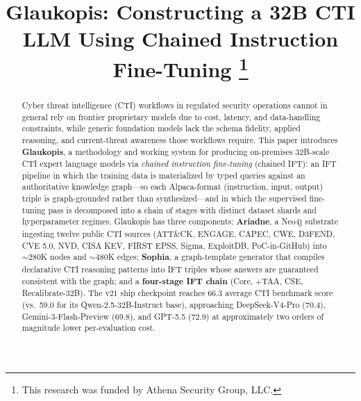 \documentclass[conference]{IEEEtran}
\begin{document}
\title{Glaukopis: Constructing a 32B CTI LLM Using Chained Instruction Fine-Tuning
\thanks{This research was funded by Athena Security Group, LLC.}
}

\author{%
%
}

\maketitle

\begin{abstract}
Cyber threat intelligence (CTI) workflows in regulated security operations cannot in general rely on frontier proprietary models due to cost, latency, and data-handling constraints, while generic foundation models lack the schema fidelity, applied reasoning, and current-threat awareness those workflows require. This paper introduces \textbf{Glaukopis}, a methodology and working system for producing on-premises 32B-scale CTI expert language models via \textit{chained instruction fine-tuning} (chained IFT): an IFT pipeline in which the training data is materialized by typed queries against an authoritative knowledge graph---so each Alpaca-format (instruction, input, output) triple is graph-grounded rather than synthesized---and in which the supervised fine-tuning pass is decomposed into a chain of stages with distinct dataset shards and hyperparameter regimes. Glaukopis has three components: \textbf{Ariadne}, a Neo4j substrate ingesting twelve public CTI sources (ATT\&CK, ENGAGE, CAPEC, CWE, D3FEND, CVE 5.0, NVD, CISA KEV, FIRST EPSS, Sigma, ExploitDB, PoC-in-GitHub) into ${\sim}280$K nodes and ${\sim}480$K edges; \textbf{Sophia}, a graph-template generator that compiles declarative CTI reasoning patterns into IFT triples whose answers are guaranteed consistent with the graph; and a \textbf{four-stage IFT chain} (Core, +TAA, CSE, Recalibrate-32B). The v21 ship checkpoint reaches 66.3 average CTI benchmark score (vs.\ 59.0 for its Qwen-2.5-32B-Instruct base), approaching DeepSeek-V4-Pro (70.4), Gemini-3-Flash-Preview (69.8), and GPT-5.5 (72.9) at approximately two orders of magnitude lower per-evaluation cost.
\end{abstract}
\end{document}
